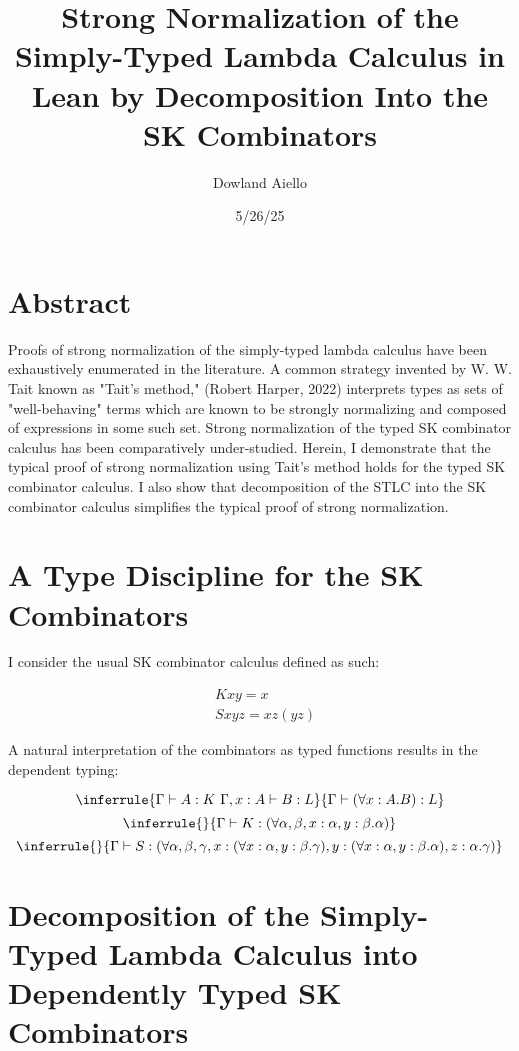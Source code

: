 \documentclass[11pt]{article}
\author{Dowland Aiello}
\date{5/26/25}
\title{Strong Normalization of the Simply-Typed Lambda Calculus in Lean by Decomposition Into the SK Combinators}
\begin{document}
\maketitle
\tableofcontents

\section{Abstract}
\label{sec:org0e76f1f}

Proofs of strong normalization of the simply-typed lambda calculus have been exhaustively enumerated in the literature. A common strategy invented by W. W. Tait known as "Tait's method," (Robert Harper, 2022) interprets types as sets of "well-behaving" terms which are known to be strongly normalizing and composed of expressions in some such set.
Strong normalization of the typed SK combinator calculus has been comparatively under-studied. Herein, I demonstrate that the typical proof of strong normalization using Tait's method holds for the typed SK combinator calculus. I also show that decomposition of the STLC into the SK combinator calculus simplifies the typical proof of strong normalization.
\section{A Type Discipline for the SK Combinators}
\label{sec:orgceca387}

I consider the usual SK combinator calculus defined as such:

\begin{align}
& K xy = x \\
& S xyz = xz (yz)
\end{align}

A natural interpretation of the combinators as typed functions results in the dependent typing:

\[
\inferrule
  { \Gamma \vdash A : K \ \Gamma,x : A \vdash B : L }
  { \Gamma \vdash (\forall x : A.B) : L}
\]
\[
\inferrule
  { }
  { \Gamma \vdash K : (\forall \alpha, \beta, x : \alpha, y : \beta.\alpha) }
\]
\[
\inferrule
  { }
  { \Gamma \vdash S : (\forall \alpha, \beta, \gamma, x : (\forall x : \alpha, y : \beta.\gamma), y : (\forall x : \alpha, y : \beta.\alpha), z : \alpha.\gamma) }
\]
\section{Decomposition of the Simply-Typed Lambda Calculus into Dependently Typed SK Combinators}
\label{sec:orgbc213ed}
\end{document}
